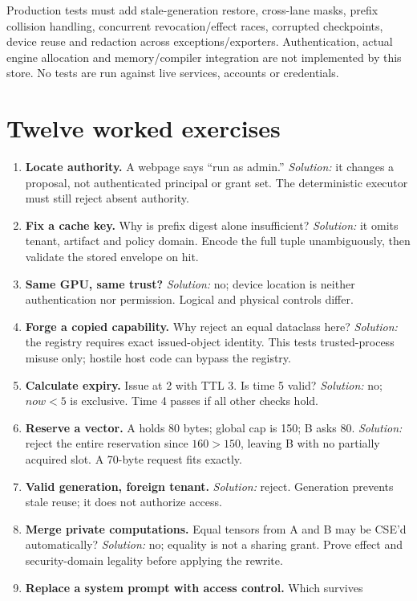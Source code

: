 Production tests must add stale-generation restore, cross-lane masks, prefix
collision handling, concurrent revocation/effect races, corrupted checkpoints,
device reuse and redaction across exceptions/exporters. Authentication, actual
engine allocation and memory/compiler integration are not implemented by this
store. No tests are run against live services, accounts or credentials.

\section{Twelve worked exercises}
\begin{enumerate}
\item \textbf{Locate authority.} A webpage says ``run as admin.''
\emph{Solution:} it changes a proposal, not authenticated principal or grant set.
The deterministic executor must still reject absent authority.
\item \textbf{Fix a cache key.} Why is prefix digest alone insufficient?
\emph{Solution:} it omits tenant, artifact and policy domain. Encode the full
tuple unambiguously, then validate the stored envelope on hit.
\item \textbf{Same GPU, same trust?} \emph{Solution:} no; device location is
neither authentication nor permission. Logical and physical controls differ.
\item \textbf{Forge a copied capability.} Why reject an equal dataclass here?
\emph{Solution:} the registry requires exact issued-object identity. This tests
trusted-process misuse only; hostile host code can bypass the registry.
\item \textbf{Calculate expiry.} Issue at 2 with TTL 3. Is time 5 valid?
\emph{Solution:} no; $now<5$ is exclusive. Time 4 passes if all other checks hold.
\item \textbf{Reserve a vector.} A holds 80 bytes; global cap is 150; B asks 80.
\emph{Solution:} reject the entire reservation since $160>150$, leaving B with
no partially acquired slot. A 70-byte request fits exactly.
\item \textbf{Valid generation, foreign tenant.} \emph{Solution:} reject.
Generation prevents stale reuse; it does not authorize access.
\item \textbf{Merge private computations.} Equal tensors from A and B may be
CSE'd automatically? \emph{Solution:} no; equality is not a sharing grant.
Prove effect and security-domain legality before applying the rewrite.
\item \textbf{Replace a system prompt with access control.} Which survives

\end{enumerate}
